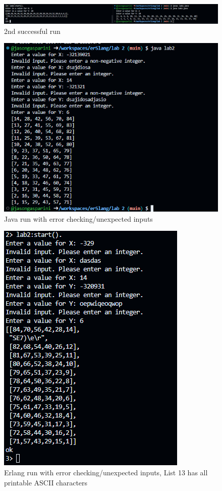 \documentclass[letterpaper, 10pt]{article}
\begin{document}
\begin{figure}
    \centering
    \includegraphics[width=\textwidth]{2.png}
    \caption{2nd successful run}
    \label{fig:2}
\end{figure}

\begin{figure}
    \centering
    \includegraphics[width=\textwidth]{3.png}
    \caption{Java run with error checking/unexpected inputs}
    \label{fig:3}
\end{figure}

\begin{figure}
    \centering
    \includegraphics[width=\textwidth]{4.png}
    \caption{Erlang run with error checking/unexpected inputs, List 13 has all printable ASCII characters}
    \label{fig:4}
\end{figure}
\end{document}
